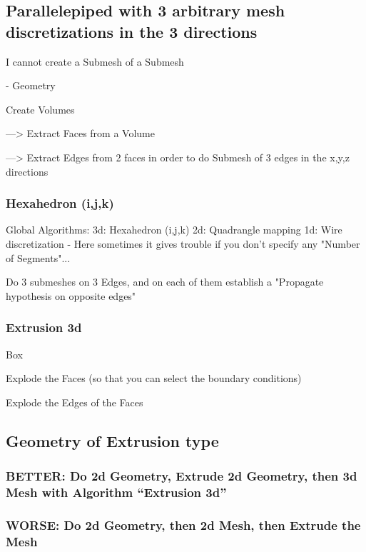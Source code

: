 \documentclass[10pt]{book}
\begin{document}
 \subsection{Parallelepiped with 3 arbitrary mesh discretizations in the 3 directions}

I cannot create a Submesh of a Submesh

- Geometry

  Create Volumes
  
    ---> Extract Faces from a Volume
    
    ---> Extract Edges from 2 faces in order to do Submesh of 3 edges in the x,y,z directions

    
    \subsubsection{Hexahedron (i,j,k)}
    
   Global Algorithms:
    3d: Hexahedron (i,j,k)
    2d: Quadrangle mapping
    1d: Wire discretization  - Here sometimes it gives trouble if you don't specify any "Number of Segments"...
    
    Do 3 submeshes on 3 Edges, and on each of them establish a "Propagate hypothesis on opposite edges"
   
    
  \subsubsection{Extrusion 3d}
  
  
  Box
  
  Explode the Faces (so that you can select the boundary conditions)
  
  Explode the Edges of the Faces
  
  
  
 \subsection{Geometry of Extrusion type}
 
  
  \subsubsection{BETTER: Do 2d Geometry, Extrude 2d Geometry, then 3d Mesh with Algorithm ``Extrusion 3d''}
  
  
  \subsubsection{WORSE: Do 2d Geometry, then 2d Mesh, then Extrude the Mesh}
 
\end{document}
